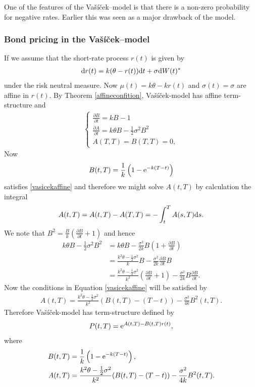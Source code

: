 One of the features of the Va\v{s}\'{i}\v{c}ek--model is that there is a non-zero probability for negative rates. Earlier this was seen as a major drawback of the model.

\subsubsection{Bond pricing in the Va\v{s}\'{i}\v{c}ek--model}

If we assume that the short-rate process $r(t)$ is given by
\begin{align}
\mathrm{d} r(t) = k ( \theta - r(t) ) \mathrm{d} t + \sigma \mathrm{d} W(t)^*
\end{align}
under the risk neutral measure. Now $\mu(t) = k \theta - k r(t)$ and $\sigma(t) = \sigma$ are affine in $r(t)$. By Theorem \ref{affineconfition}, Va\v{s}\'{i}\v{c}ek-model has affine term-structure and
\begin{align}
\label{vasicekaffine}
\begin{cases}
\frac{\partial B}{\partial t} = k B - 1 \\
\frac{\partial A}{\partial t} = k \theta B - \frac{1}{2} \sigma^2 B^2 \\
A(T,T) = B(T,T) = 0, 
\end{cases}
\end{align}
Now
\begin{align}
B(t,T) = \frac{1}{k} \left( 1 - \mathrm{e}^{-k (T-t)} \right)
\end{align}
satisfies \ref{vasicekaffine} and therefore we might solve $A(t,T)$ by calculation the integral
\begin{align}
A(t,T) = A(t,T) - A(T,T) = - \int_t^T A(s,T) \mathrm{d} s.
\end{align}
We note that $B^2 = \frac{B}{k} \left( \frac{\partial B}{\partial t} + 1 \right)$ and hence
\begin{align}
k \theta B - \frac{1}{2} \sigma^2 B^2 &= k \theta B - \frac{\sigma^2}{2k} B(1+\frac{\partial B}{\partial t}) \\
&= \frac{k^2 \theta - \frac{1}{2}\sigma^2}{k} B  - \frac{\sigma^2}{2k} \frac{\partial B}{\partial t} B \\
&= \frac{k^2 \theta - \frac{1}{2}\sigma^2}{k^2} (\frac{\partial B}{\partial t} + 1) - \frac{\sigma^2}{2k} B\frac{\partial B}{\partial t} .
\end{align} 
Now the conditions in Equation \ref{vasicekaffine} will be satisfied by
\begin{align}
A(t,T) = \frac{k^2 \theta - \frac{1}{2}\sigma^2}{k^2} (B(t,T) - (T - t)) - \frac{\sigma^2}{4 k} B^2(t,T) .
\end{align}
Therefore Va\v{s}\'{i}\v{c}ek-model has term-structure defined by
\begin{align}
P(t,T) = \mathrm{e}^{A(t,T) - B(t,T)r(t)},
\end{align}
where 
\begin{align}
B(t,T) &= \frac{1}{ k} \left( 1 - \mathrm{e}^{-k (T-t)} \right), \\
A(t,T) &= \frac{k^2 \theta - \frac{1}{2}\sigma^2}{k^2} (B(t,T) - (T - t)) - \frac{\sigma^2}{4k} B^2(t,T).
\end{align}

